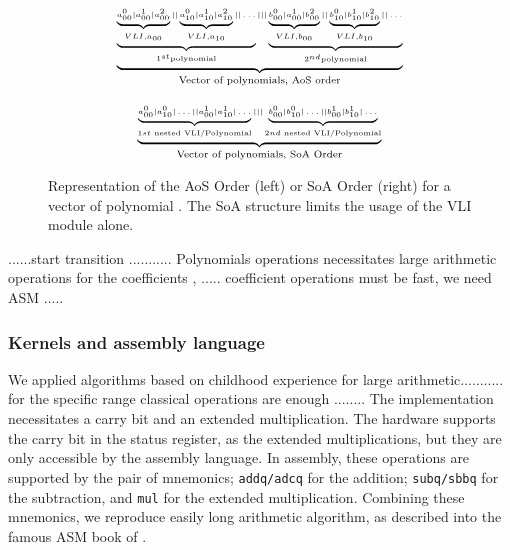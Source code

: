 \documentclass[oribibl]{llncs2e/llncs}
\begin{document}
\begin{figure}
    \begin{minipage}{0.50\linewidth}
        \begin{eqnarray}
        \tiny{
                 \underbrace{
                 \underbrace{ \underbrace{a^0_{00} | a^1_{00} | a^2_{00}}_{VLI, a_{00} } || \underbrace{a^0_{10} | a^1_{10} | a^2_{10}}_{VLI, a_{10}} ||   \dots  }_{1^{st} \textrm{polynomial}} 
                  |||    \underbrace{ \underbrace{b^0_{00} | a^1_{00} | b^2_{00}}_{VLI, b_{00} } || \underbrace{b^0_{10} | b^1_{10} | b^2_{10}}_{VLI, b_{10}} ||   \dots  }_{2^{nd} \textrm{polynomial} } }_{\textrm{Vector of polynomials, AoS order}} \nonumber
            }
        \end{eqnarray}
    \end{minipage}
\begin{minipage}{0.50\linewidth}
    \begin{eqnarray}
    \tiny{
        \underbrace{
        \underbrace{a^0_{00} | a^0_{10} | \dots || a^1_{00} | a^1_{10} | \dots  }_{1st  \textrm{ nested VLI/Polynomial} } |||  \underbrace{b^0_{00} | b^0_{10} | \dots || b^1_{00} | b^1_{10} | \dots  }_{2nd  \textrm{ nested VLI/Polynomial} }
        }_{\textrm{Vector of polynomials, SoA Order}} \nonumber }
        \end{eqnarray}
\end{minipage}
\caption{Representation of the AoS Order (left) or SoA Order (right) for a vector of polynomial \label{AOSSOA}.  The SoA structure limits the usage of the VLI module alone.}
\end{figure}



......start transition ...........  Polynomials operations necessitates large arithmetic operations for the coefficients , ..... coefficient operations must be fast, we need ASM ..... 



\subsubsection{Kernels and assembly  language}





We applied algorithms based on childhood  experience for large arithmetic........... for the specific range classical operations are enough ........
The implementation necessitates a carry bit and an extended multiplication. The hardware supports
the carry bit in the status register, as the extended multiplications, but they are only accessible by the assembly language.
In assembly, these operations  are supported by the pair of mnemonics; \texttt{addq/adcq} for the addition; \texttt{subq/sbbq} for the subtraction, and \texttt{mul} for the extended multiplication.   
Combining these mnemonics, we reproduce easily long arithmetic algorithm, as described into the famous  ASM book of \cite{Hyde:2003:AAL:861534}. 
\end{document}
